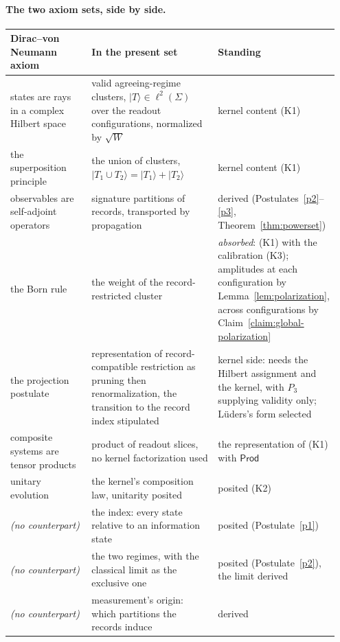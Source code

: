 \paragraph{The two axiom sets, side by side.}
\begin{center}
\footnotesize
\begin{tabular}{@{}p{0.27\linewidth}p{0.42\linewidth}p{0.26\linewidth}@{}}
\hline
\textbf{Dirac--von Neumann axiom} & \textbf{In the present set} & \textbf{Standing} \\
\hline
states are rays in a complex Hilbert space & valid agreeing-regime clusters, $|T\rangle \in \ell^2(\Sigma)$ over the readout configurations, normalized by $\sqrt{W}$ & kernel content (K1) \\
the superposition principle & the union of clusters, $|T_1 \cup T_2\rangle = |T_1\rangle + |T_2\rangle$ & kernel content (K1) \\
observables are self-adjoint operators & signature partitions of records, transported by propagation & derived (Postulates~\ref{p2}--\ref{p3}, Theorem~\ref{thm:powerset}) \\
the Born rule & the weight of the record-restricted cluster & \emph{absorbed}: (K1) with the calibration (K3); amplitudes at each configuration by Lemma~\ref{lem:polarization}, across configurations by Claim~\ref{claim:global-polarization} \\
the projection postulate & representation of record-compatible restriction as pruning then renormalization, the transition to the record index stipulated & kernel side: needs the Hilbert assignment and the kernel, with $P_3$ supplying validity only; L\"uders's form selected \\
composite systems are tensor products & product of readout slices, no kernel factorization used & the representation of (K1) with $\mathsf{Prod}$ \\
unitary evolution & the kernel's composition law, unitarity posited & posited (K2) \\
\hline
\textit{(no counterpart)} & the index: every state relative to an information state & posited (Postulate~\ref{p1}) \\
\textit{(no counterpart)} & the two regimes, with the classical limit as the exclusive one & posited (Postulate~\ref{p2}), the limit derived \\
\textit{(no counterpart)} & measurement's origin: which partitions the records induce & derived \\
\hline
\end{tabular}
\end{center}
